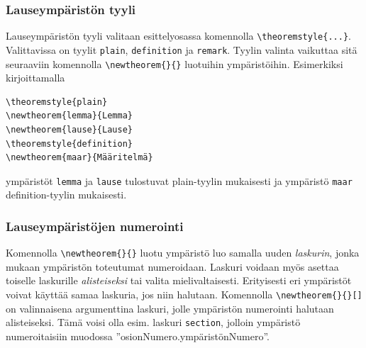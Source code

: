 \begin{frame}[fragile]
    \frametitle{Lauseympäristön tyyli}
    Lauseympäristön tyyli valitaan esittelyosassa komennolla \verb-\theoremstyle{...}-. Valittavissa on tyylit \verb-plain-, \verb-definition- ja \verb-remark-. Tyylin valinta vaikuttaa sitä seuraaviin komennolla \verb-\newtheorem{}{}- luotuihin ympäristöihin.
    \vaihto
    Esimerkiksi kirjoittamalla
    \pause
    \begin{Verbatim}[frame=single]
\theoremstyle{plain}
\newtheorem{lemma}{Lemma}
\newtheorem{lause}{Lause}
\theoremstyle{definition}
\newtheorem{maar}{Määritelmä}
    \end{Verbatim}
    \pause
    ympäristöt \verb-lemma- ja \verb-lause- tulostuvat plain-tyylin mukaisesti ja ympäristö \verb-maar- definition-tyylin mukaisesti.
\end{frame}
\begin{frame}[fragile]
    
\end{frame}
\begin{frame}[fragile]
    \frametitle{Lauseympäristöjen numerointi}
    Komennolla \verb-\newtheorem{}{}- luotu ympäristö luo samalla uuden \emph{laskurin}, jonka mukaan ympäristön toteutumat numeroidaan. 
    \vaihto
    Laskuri voidaan myös asettaa toiselle laskurille \emph{alisteiseksi} tai valita mielivaltaisesti. Erityisesti eri ympäristöt voivat käyttää samaa laskuria, jos niin halutaan.
    \vaihto
    Komennolla \verb-\newtheorem{}{}[]- on valinnaisena argumenttina laskuri, jolle ympäristön numerointi halutaan alisteiseksi. Tämä voisi olla esim. laskuri \verb-section-, jolloin ympäristö numeroitaisiin muodossa ''osionNumero.ympäristönNumero''.
\end{frame}
